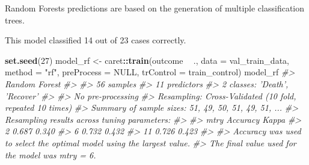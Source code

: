 \documentclass[]{book}
\newenvironment{Shaded}{\begin{snugshade}}{\end{snugshade}}
\newcommand{\CommentTok}[1]{\textcolor[rgb]{0.56,0.35,0.01}{\textit{#1}}}
\newcommand{\DataTypeTok}[1]{\textcolor[rgb]{0.13,0.29,0.53}{#1}}
\newcommand{\DecValTok}[1]{\textcolor[rgb]{0.00,0.00,0.81}{#1}}
\newcommand{\KeywordTok}[1]{\textcolor[rgb]{0.13,0.29,0.53}{\textbf{#1}}}
\newcommand{\NormalTok}[1]{#1}
\newcommand{\OperatorTok}[1]{\textcolor[rgb]{0.81,0.36,0.00}{\textbf{#1}}}
\newcommand{\OtherTok}[1]{\textcolor[rgb]{0.56,0.35,0.01}{#1}}
\newcommand{\StringTok}[1]{\textcolor[rgb]{0.31,0.60,0.02}{#1}}
\begin{document}
Random Forests predictions are based on the generation of multiple classification trees.

This model classified 14 out of 23 cases correctly.

\begin{Shaded}
\begin{Highlighting}[]
\KeywordTok{set.seed}\NormalTok{(}\DecValTok{27}\NormalTok{)}
\NormalTok{model_rf <-}\StringTok{ }\NormalTok{caret}\OperatorTok{::}\KeywordTok{train}\NormalTok{(outcome }\OperatorTok{~}\StringTok{ }\NormalTok{.,}
                             \DataTypeTok{data =}\NormalTok{ val_train_data,}
                             \DataTypeTok{method =} \StringTok{"rf"}\NormalTok{,}
                             \DataTypeTok{preProcess =} \OtherTok{NULL}\NormalTok{,}
                             \DataTypeTok{trControl =}\NormalTok{ train_control)}
\NormalTok{model_rf}
\CommentTok{#> Random Forest }
\CommentTok{#> }
\CommentTok{#> 56 samples}
\CommentTok{#> 11 predictors}
\CommentTok{#>  2 classes: 'Death', 'Recover' }
\CommentTok{#> }
\CommentTok{#> No pre-processing}
\CommentTok{#> Resampling: Cross-Validated (10 fold, repeated 10 times) }
\CommentTok{#> Summary of sample sizes: 51, 49, 50, 51, 49, 51, ... }
\CommentTok{#> Resampling results across tuning parameters:}
\CommentTok{#> }
\CommentTok{#>   mtry  Accuracy  Kappa}
\CommentTok{#>    2    0.687     0.340}
\CommentTok{#>    6    0.732     0.432}
\CommentTok{#>   11    0.726     0.423}
\CommentTok{#> }
\CommentTok{#> Accuracy was used to select the optimal model using the largest value.}
\CommentTok{#> The final value used for the model was mtry = 6.}
\end{Highlighting}
\end{Shaded}
\end{document}
